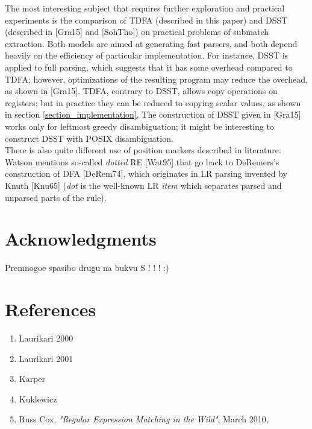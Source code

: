 \documentclass{article}
\theoremstyle{definition}
\begin{document}
\begin{multicols}{2}
The most interesting subject that requires further exploration and practical experiments
is the comparison of TDFA (described in this paper) and DSST (described in [Gra15] and [SohTho])
on practical problems of submatch extraction.
Both models are aimed at generating fast parsers,
and both depend heavily on the efficiency of particular implementation.
For instance, DSST is applied to full parsing, which suggests that it has some overhead compared to TDFA;
however, optimizations of the resulting program may reduce the overhead, as shown in [Gra15].
TDFA, contrary to DSST, allows copy operations on registers;
but in practice they can be reduced to copying scalar values, as shown in section \ref{section_implementation}.
The construction of DSST given in [Gra15] works only for leftmost greedy disambiguation;
it might be interesting to construct DSST with POSIX disambiguation.
\\

There is also quite different use of position markers described in literature:
Watson mentions so-called \emph{dotted} RE [Wat95]
that go back to DeRemers's construction of DFA [DeRem74],
which originates in LR parsing invented by Knuth [Knu65]
(\emph{dot} is the well-known LR \emph{item} which separates parsed and unparsed parts of the rule).

\section*{Acknowledgments}

Premnogoe spasibo drugu na bukvu S ! ! ! :)

\end{multicols}
\pagebreak

\section*{References}

\begin{enumerate}
\item Laurikari 2000
\item Laurikari 2001
\item Karper
\item Kuklewicz

    \item \! [Cox10] Russ Cox, \textit{"Regular Expression Matching in the Wild"}, March 2010, \\

\end{enumerate}
\end{document}
